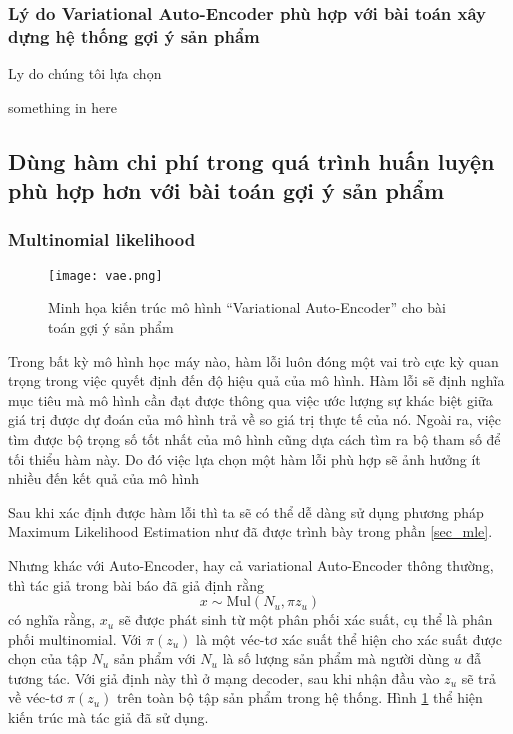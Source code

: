     \subsubsection{Lý do Variational Auto-Encoder phù hợp với bài toán xây dựng hệ thống gợi ý sản phẩm}
    Ly do chúng tôi lựa chọn

    \label{why_vae}
    something in here
    \subsection{Dùng hàm chi phí trong quá trình huấn luyện phù hợp hơn với bài toán gợi ý sản phẩm}


    \subsubsection{Multinomial likelihood}
    \label{mulll}
    \begin{figure}
        \centering
        \texttt{[image: vae.png]}
        \caption{Minh họa kiến trúc mô hình ``Variational Auto-Encoder'' cho bài toán gợi ý sản phẩm}
        \label{fig_mvae}
    \end{figure}
    Trong bất kỳ mô hình học máy nào, hàm lỗi luôn đóng một vai trò cực kỳ quan trọng trong việc quyết định đến độ hiệu quả của mô hình. 
    Hàm lỗi sẽ định nghĩa mục tiêu mà mô hình cần đạt được thông qua việc ước lượng sự khác biệt giữa giá trị được dự đoán của mô hình trả về so giá trị thực tế của nó.
    Ngoài ra, việc tìm được bộ trọng số tốt nhất của mô hình cũng dựa cách tìm ra bộ tham số để tối thiểu hàm này.
    Do đó việc lựa chọn một hàm lỗi phù hợp sẽ ảnh hưởng ít nhiều đến kết quả của mô hình 

    Sau khi xác định được hàm lỗi thì ta sẽ có thể dễ dàng sử dụng phương pháp Maximum Likelihood Estimation như đã được trình bày trong phần \ref{sec_mle}.

    Nhưng khác với Auto-Encoder, hay cả variational Auto-Encoder thông thường, thì tác giả trong bài báo \cite{mvae} đã giả định rằng 
    \begin{equation}
        \label{asumpt_xu}
        x \sim \text{Mul}(N_u,\pi{z_u})
    \end{equation}
    có nghĩa rằng, $x_u$ sẽ được phát sinh từ một phân phối xác suất, cụ thể là phân phối multinomial.
    Với $\pi(z_u)$ là một véc-tơ xác suất thể hiện cho xác suất được chọn của tập $N_u$ sản phẩm  với $N_u$ là số lượng sản phẩm mà người dùng $u$ đẫ tương tác. 
    Với giả định này thì ở mạng decoder, sau khi nhận đầu vào $z_u$ sẽ trả về véc-tơ $\pi(z_u)$ trên toàn bộ tập sản phẩm trong hệ thống. 
    Hình \ref{fig_mvae} thể hiện kiến trúc mà tác giả đã sử dụng. 

